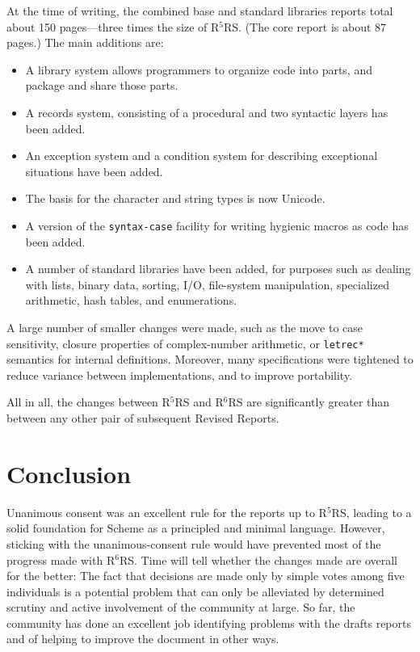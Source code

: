 \documentclass{sigplanconf}
\newcommand{\rn}[1]{R$^{#1}$RS}
\begin{document}
At the time of writing, the combined base and standard
libraries reports total about 150 pages---three times the size
of \rn{5}.  (The core report is about 87 pages.)  The main additions
are:
%
\begin{itemize}
\item A library system allows programmers to organize code into parts,
  and package and share those parts.
\item A records system, consisting of a procedural and two syntactic
  layers has been added.
\item An exception system and a condition system for describing
  exceptional situations have been added.
\item The basis for the character and string types is now Unicode.
\item A version of the \texttt{syntax-case} facility for writing
  hygienic macros as code has been added.
\item A number of standard libraries have been added, for purposes
  such as dealing with lists, binary data, sorting, I/O, file-system
  manipulation, specialized arithmetic, hash tables, and enumerations.
\end{itemize}
%
A large number of smaller changes were made, such as the move to case
sensitivity, closure properties of complex-number arithmetic, or
\texttt{letrec*} semantics for internal definitions.  Moreover, many
specifications were tightened to reduce variance between
implementations, and to improve portability.

All in all, the changes between \rn{5} and \rn{6} are significantly
greater than between any other pair of subsequent Revised
Reports.

\section{Conclusion}
\label{sec:conclusion}

Unanimous consent was an excellent rule for the reports up to \rn{5},
leading to a solid foundation for Scheme as a principled and minimal
language.  However, sticking with the unanimous-consent rule would
have prevented most of the progress made with \rn{6}.  Time will tell
whether the changes made are overall for the better: The fact that
decisions are made only by simple votes among five individuals is a
potential problem that can only be alleviated by determined scrutiny
and active involvement of the community at large.  So far, the
community has done an excellent job identifying problems with the
drafts reports and of helping to improve the document in other ways.
\end{document}
